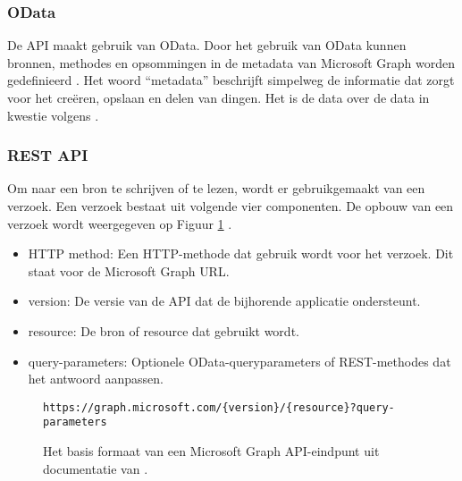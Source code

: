 \subsubsection{OData}

De \ac{API} maakt gebruik van OData. Door het gebruik van OData kunnen bronnen, methodes en opsommingen in de metadata van Microsoft Graph worden gedefinieerd \autocite{Microsoft2023vv}. Het woord “metadata” beschrijft simpelweg de informatie dat zorgt voor het creëren, opslaan en delen van dingen. Het is de data over de data in kwestie volgens \textcite{Riley2017}.

\subsubsection{REST API}

Om naar een bron te schrijven of te lezen, wordt er gebruikgemaakt van een verzoek. Een verzoek bestaat uit volgende vier componenten. De opbouw van een verzoek wordt weergegeven op Figuur \ref{RAM} \autocite{Microsoft2023vv}.

\begin{itemize}
    \item \ac{HTTP} method: Een \ac{HTTP}-methode dat gebruik wordt voor het verzoek. Dit staat voor de Microsoft Graph \ac{URL}.
    \item version: De versie van de \ac{API} dat de bijhorende applicatie ondersteunt.
    \item resource: De bron of resource dat gebruikt wordt.
    \item query-parameters: Optionele OData-queryparameters of \Ac{REST}-methodes dat het antwoord aanpassen.
\end{itemize}

\begin{figure}[h!]
    \scriptsize
    \begin{verbatim}
https://graph.microsoft.com/{version}/{resource}?query-parameters
    \end{verbatim}    
    \caption[Basis formaat Microsoft Graph API-eindpunt]{Het basis formaat van een Microsoft Graph \Ac{API}-eindpunt uit documentatie van \textcite{Microsoft2023o}.}
    \label{RAM}
\end{figure}



\begin{comment}
Wanneer er een verzoek wordt verstuurd, krijgt dit ook een antwoord terug. Een antwoord bestaat uit minstens volgende onderdelen: 

\begin{itemize}
    \item Status code:
    \item Response message:
    \item @odata.nextLink:
\end{itemize}
\end{comment}

